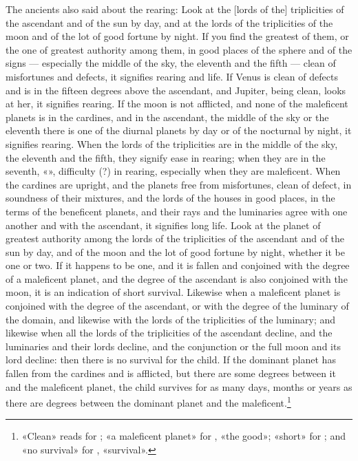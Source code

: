 \documentclass[11pt]{article}
\newcommand{\Fol}[1]{\marginpar{\footnotesize\color{gray}f.\,#1}}
\begin{document}
\par \Fol{44v}The ancients also said about the rearing: Look at the [lords of the] triplicities of the ascendant and of the sun by day, and at the lords of the triplicities of the moon and of the lot of good fortune by night. If you find the greatest of them, or the one of greatest authority among them, in good places of the sphere and of the signs — especially the middle of the sky, the eleventh and the fifth — clean of misfortunes and defects, it signifies rearing and life. If Venus is clean of defects and is in the fifteen degrees above the ascendant, and Jupiter, being clean, looks at her, it signifies rearing. If the moon is not afflicted, and none of the maleficent planets is in the cardines, and in the ascendant, the middle of the sky or the eleventh there is one of the diurnal planets by day or of the nocturnal by night, it signifies rearing. When the lords of the triplicities are in the middle of the sky, the eleventh and the fifth, they signify ease in rearing; when they are in the seventh, «», difficulty (?) in rearing, especially when they are maleficent. When the cardines are upright, and the planets free from misfortunes, clean of defect, in soundness of their mixtures, and the lords of the houses in good places, in the terms of the beneficent planets, and their rays and the luminaries agree with one another and with the ascendant, it signifies long life. Look at the planet of greatest authority among the lords of the triplicities of the ascendant and of the sun by day, and of the moon and the lot of good fortune by night, whether it be one or two. If it happens to be one, and it is fallen and conjoined with the degree of a maleficent planet, and the degree of the ascendant is also conjoined with the moon, it is an indication of short survival. Likewise when a maleficent planet is conjoined with the degree of the ascendant, or with the degree of the luminary of the domain, and likewise with the lords of the triplicities of the luminary; and likewise when all the lords of the triplicities of the ascendant decline, and the luminaries and their lords decline, and the conjunction or the full moon and its lord decline: then there is no survival for the child. If the dominant planet has fallen from the cardines and is afflicted, but there are some degrees between it and the maleficent planet, the child survives for as many days, months or years as there are degrees between the dominant planet and the maleficent.\footnote{«Clean» reads  for ; «a maleficent planet»  for , «the good»; «short»  for ; and «no survival»  for , «survival».}\par
\end{document}
